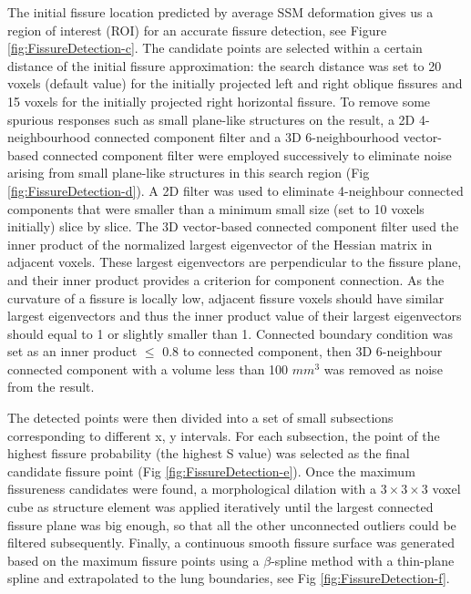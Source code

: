 {The initial fissure location predicted by average SSM deformation gives us a region of interest (ROI) for an accurate fissure detection, see Figure \ref{fig:FissureDetection-c}. The candidate points are selected within a certain distance of the initial fissure approximation: the search distance was set to 20 voxels (default value) for the initially projected left and right oblique fissures and 15 voxels for the initially projected right horizontal fissure. To remove some spurious responses such as small plane-like structures on the result, a 2D 4-neighbourhood connected component filter and a 3D 6-neighbourhood vector-based connected component filter were employed successively to eliminate noise arising from small plane-like structures in this search region (Fig \ref{fig:FissureDetection-d}). A 2D filter was used to eliminate 4-neighbour connected components that were smaller than a minimum small size (set to 10 voxels initially) slice by slice. The 3D vector-based connected component filter used the inner product of the normalized largest eigenvector of the Hessian matrix in adjacent voxels. These largest eigenvectors are perpendicular to the fissure plane, and their inner product provides a criterion for component connection. As the curvature of a fissure is locally low, adjacent fissure voxels should have similar largest eigenvectors and thus the inner product value of their largest eigenvectors should equal to 1 or slightly smaller than 1. Connected boundary condition was set as an inner product $\leq$ 0.8 to connected component, then 3D 6-neighbour connected component with a volume less than 100 \textsl{$mm^3$} was removed as noise from the result.

The detected points were then divided into a set of small subsections corresponding to different x, y intervals. For each subsection, the point of the highest fissure probability (the highest S value) was selected as the final candidate fissure point (Fig \ref{fig:FissureDetection-e}). Once the maximum fissureness candidates were found, a morphological dilation with a $3\times3\times3$ voxel cube as structure element was applied iteratively until the largest connected fissure plane was big enough, so that all the other unconnected outliers could be filtered subsequently. Finally, a continuous smooth fissure surface was generated based on the maximum fissure points using a $\beta$-spline method with a thin-plane spline \citep{lee1997scattered} and extrapolated to the lung boundaries, see Fig \ref{fig:FissureDetection-f}.

}
